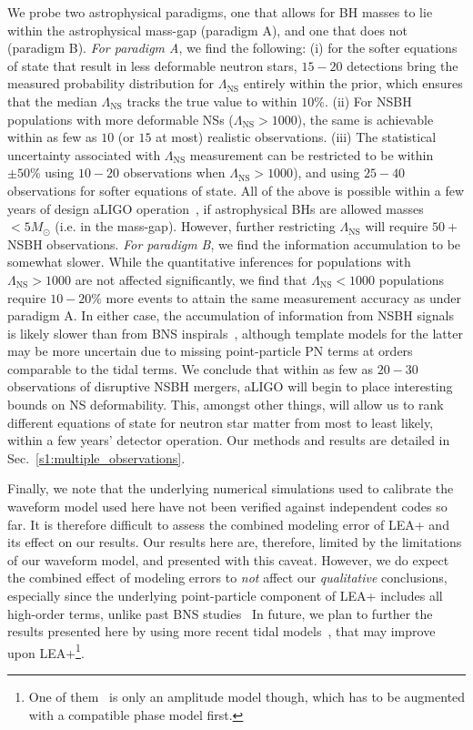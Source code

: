 \documentclass[aps,prd,amsmath,floats,floatfix, twocolumn,
superscriptaddress,nofootinbib,showpacs]{revtex4-1}
\newcommand{\lambdans}{\Lambda_\mathrm{NS}}
\begin{document}
We probe two astrophysical paradigms, one that allows for BH masses to lie
within the astrophysical mass-gap (paradigm A), and one that does not (paradigm
B).
% 
{\it For paradigm A}, we find the following: (i) for the softer equations of
state that result in less deformable neutron stars, $15-20$ detections bring
the measured probability distribution for $\lambdans$ entirely within the prior,
which ensures that the median $\lambdans$ tracks the true value to within $10\%$.
(ii) For NSBH populations with more deformable NSs ($\lambdans> 1000$),
the same is achievable within as few as $10$ (or $15$ at most) realistic
observations. (iii) The statistical uncertainty associated with $\lambdans$
measurement can be restricted to be within $\pm50\%$ using $10-20$ observations
when $\lambdans> 1000$), and using $25-40$ observations for softer equations
of state. All of the above is possible within a few years of design
aLIGO operation~\cite{Abadie:2010cfa}, if astrophysical BHs are allowed
masses $< 5M_\odot$ (i.e. in the mass-gap). However, further
restricting $\lambdans$ will require $50+$ NSBH observations.
% 
{\it For paradigm B}, we find the information accumulation to be somewhat slower.
While the quantitative inferences for populations with $\lambdans>1000$ are
not affected significantly, we find that $\lambdans< 1000$ populations require 
$10-20\%$ more events to attain the same measurement accuracy as under
paradigm A. In either case, the accumulation of information from NSBH signals
is likely slower than from BNS inspirals~\cite{Mandel:2009pc,Lackey2014,
Wade:2014vqa}, although template models for the latter may be more
uncertain due to missing point-particle PN terms at orders comparable to
the tidal terms.
% 
We conclude that within as few as $20-30$ observations of disruptive NSBH
mergers, aLIGO will begin to place interesting bounds on NS deformability.
This, amongst other things, will allow us to rank different equations of 
state for neutron star matter from most to least likely, within a few years'
detector operation.
% 
Our methods and results are detailed in Sec.~\ref{s1:multiple_observations}.









Finally, we note that the underlying numerical simulations used to calibrate
the waveform model used here have not been verified against
independent codes so far.
% 
It is therefore difficult to assess the combined modeling error of LEA+ and its
effect
on our results. Our results here are, therefore, limited by the limitations of
our waveform model, and presented with this caveat. However, we do expect the
combined effect of modeling errors to {\it not} affect our {\it qualitative}
conclusions, especially since the underlying point-particle component of LEA+
includes all high-order terms, unlike past BNS studies~\cite{Lackey2014,
Wade:2014vqa}
% 
In future, we plan to further the results presented here by using more recent
tidal models~\cite{Pannarale:2015jka,Hinderer:2016eia}, that
may improve upon LEA+\footnote{One of them~\cite{Pannarale:2015jka} is only an
amplitude model though, which has to be augmented with a compatible phase model
first.}.
\end{document}
